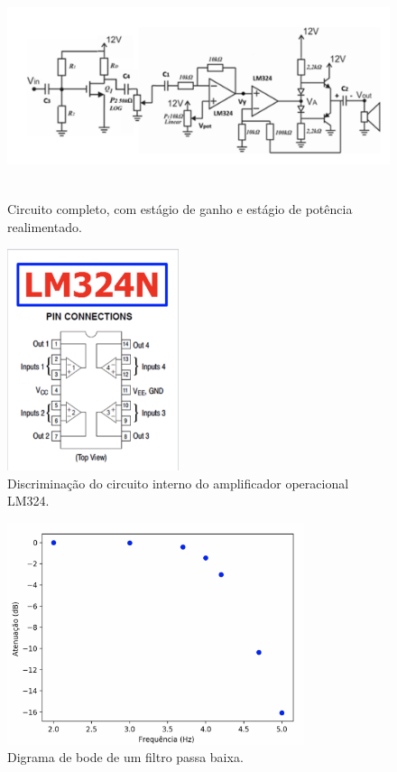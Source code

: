     \begin{figure}[h!]
        \centering
        \includegraphics[height=6.5cm]{imgSource/circuits/monstro.png}
        \caption{Circuito completo, com estágio de ganho e estágio de potência realimentado.}
        \label{fig:circ5}
    \end{figure}
    
    \begin{figure}[h!]
        \centering
        \includegraphics[height=6.5cm]{imgSource/ampOpPorts.png}
        \caption{Discriminação do circuito interno do amplificador operacional LM324.}
        \label{fig:circAmpOp}
    \end{figure}

    \begin{figure}[h!]
        \centering
        \includegraphics[height=6.5cm]{imgSource/charts/passabaixa.png}
        \caption{Digrama de bode de um filtro passa baixa.}
        \label{fig:passaBaixa}
    \end{figure}
   
